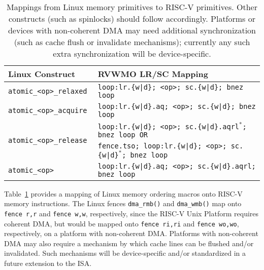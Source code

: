 \begin{table}[h!]
\begin{tabular}{|l|l|}
    \hline
    \hline
    Linux Construct            & RVWMO LR/SC Mapping\\
    \hline
    \tt atomic\_<op>\_relaxed  & \tt loop:\@ lr.\{w|d\}; <op>; sc.\{w|d\}; bnez loop \\
    \hline
    \tt atomic\_<op>\_acquire  & \tt loop:\@ lr.\{w|d\}.aq; <op>; sc.\{w|d\}; bnez loop \\
    \hline
    \multirow{2}{*}{\tt atomic\_<op>\_release}
      & \tt loop:\@ lr.\{w|d\}; <op>; sc.\{w|d\}.aqrl$^*$; bnez loop \textrm{OR} \\
      & \tt fence.tso; loop:\@ lr.\{w|d\}; <op>; sc.\{w|d\}$^*$; bnez loop \\
    \hline
    \tt atomic\_<op>           & \tt loop:\@ lr.\{w|d\}.aq; <op>; sc.\{w|d\}.aqrl; bnez loop \\
    \hline
  \end{tabular}
  \caption{Mappings from Linux memory primitives to RISC-V primitives.  Other constructs (such as spinlocks) should follow accordingly.  Platforms or devices with non-coherent DMA may need additional synchronization (such as cache flush or invalidate mechanisms); currently any such extra synchronization will be device-specific.}
  \label{tab:linuxmappings}
\end{table}

Table~\ref{tab:linuxmappings} provides a mapping of Linux memory ordering macros onto RISC-V memory instructions.
The Linux fences {\tt dma\_rmb()} and {\tt dma\_wmb()} map onto {\tt fence r,r} and {\tt fence w,w}, respectively, since the RISC-V Unix Platform requires coherent DMA, but would be mapped onto {\tt fence ri,ri} and {\tt fence wo,wo}, respectively, on a platform with non-coherent DMA.
Platforms with non-coherent DMA may also require a mechanism by which cache lines can be flushed and/or invalidated.
Such mechanisms will be device-specific and/or standardized in a future extension to the ISA.

